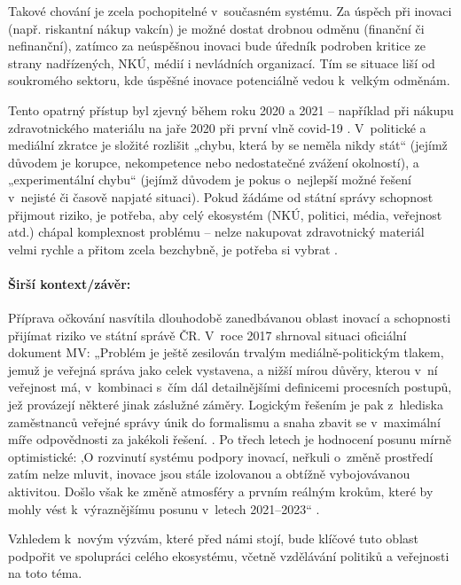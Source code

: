 Takové chování je zcela pochopitelné v~současném systému. Za úspěch při inovaci (např. riskantní nákup vakcín) je možné dostat drobnou odměnu (finanční či nefinanční), zatímco za neúspěšnou inovaci bude úředník podroben kritice ze strany nadřízených, NKÚ, médií i nevládních organizací. Tím se situace liší od soukromého sektoru, kde úspěšné inovace potenciálně vedou k~velkým odměnám.

Tento opatrný přístup byl zjevný během roku 2020 a 2021 -- například při nákupu zdravotnického materiálu na jaře 2020 při první vlně covid-19 \cite{nejvyssi_kontrolni_urad_stat_2021}. V~politické a mediální zkratce je složité rozlišit „chybu, která by se neměla nikdy stát“ (jejímž důvodem je korupce, nekompetence nebo nedostatečné zvážení okolností), a „experimentální chybu“ (jejímž důvodem je pokus o~nejlepší možné řešení v~nejisté či časově napjaté situaci). Pokud žádáme od státní správy schopnost přijmout riziko, je potřeba, aby celý ekosystém (NKÚ, politici, média, veřejnost atd.) chápal komplexnost problému -- nelze nakupovat zdravotnický materiál velmi rychle a přitom zcela bezchybně, je potřeba si vybrat \cite{noauthor_how_2020}.

\paragraph{Širší kontext/závěr:} Příprava očkování nasvítila dlouhodobě zanedbávanou oblast inovací a schopnosti přijímat riziko ve státní správě ČR. V~roce 2017 shrnoval situaci oficiální dokument MV: „Problém je ještě zesilován trvalým mediálně-politickým tlakem, jemuž je veřejná správa jako celek vystavena, a nižší mírou důvěry, kterou v~ní veřejnost má, v~kombinaci s~čím dál detailnějšími definicemi procesních postupů, jež provázejí některé jinak záslužné záměry. Logickým řešením je pak z~hlediska zaměstnanců veřejné správy únik do formalismu a snaha zbavit se v~maximální míře odpovědnosti za jakékoli řešení. \cite{pg:polasek2016}. Po třech letech je hodnocení posunu mírně optimistické: ‚O rozvinutí systému podpory inovací, neřkuli o~změně prostředí zatím nelze mluvit, inovace jsou stále izolovanou a obtížně vybojovávanou aktivitou. Došlo však ke změně atmosféry a prvním reálným krokům, které by mohly vést k~výraznějšímu posunu v~letech 2021–2023“ \cite{cr2030_kvalita_udrzitelnost}.

Vzhledem k~novým výzvám, které před námi stojí, bude klíčové tuto oblast
podpořit ve spolupráci celého ekosystému, včetně vzdělávání politiků a
veřejnosti na toto téma.

